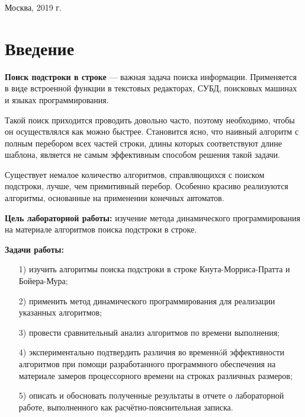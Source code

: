\documentclass[a4paper,12pt]{article}
\begin{document}
\vspace*{40mm}
\begin{center}
	Москва, 2019 г.  
\end{center}
\thispagestyle{empty}

\tableofcontents

\section*{Введение}

\textbf{Поиск подстроки в строке} --- важная задача поиска информации.
Применяется в виде встроенной функции в текстовых редакторах, СУБД,
поисковых машинах и языках программирования.

Такой поиск приходится проводить довольно часто, поэтому необходимо, чтобы
он осуществлялся как можно быстрее. Становится ясно, что наивный алгоритм с
полным перебором всех частей строки, длины которых соответствуют
длине шаблона, является не самым эффективным способом решения такой задачи.

Существует немалое количество алгоритмов, справляющихся с поиском подстроки,
лучше, чем примитивный перебор. Особенно красиво реализуются
алгоритмы, основанные на применении конечных автоматов.

\textbf{Цель лабораторной работы:} изучение метода динамического программирования
на материале алгоритмов поиска подстроки в строке.

\textbf{Задачи работы:}

\begin{enumerate} 
	\item[1)] изучить алгоритмы поиска подстроки в строке Кнута-Морриса-Пратта
	и Бойера-Мура;
	\item[2)] применить метод динамического программирования для  
	реализации указанных алгоритмов;
	\item[3)] провести сравнительный анализ алгоритмов по времени выполнения;
	\item[4)] экспериментально подтвердить различия во временнóй эффективности алгоритмов 
	при помощи разработанного программного обеспечения на материале замеров процессорного 
	времени на строках различных размеров;
	\item[5)] описать и обосновать полученные результаты в отчете о лабораторной 
	работе, выполненного как расчётно-пояснительная записка. 
\end{enumerate} 
\pagebreak
\end{document}
